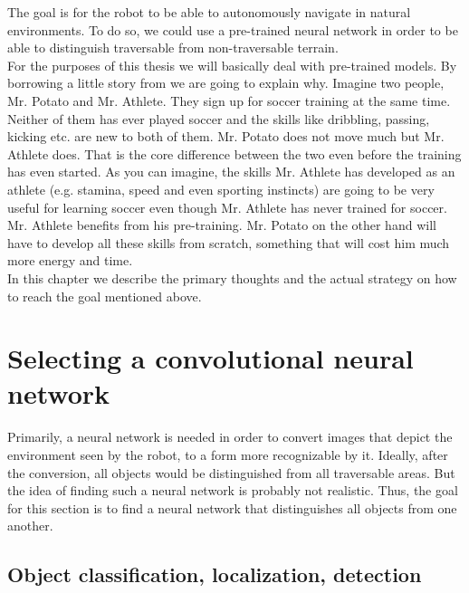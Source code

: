\documentclass[12pt,a4paper,table,dvipsnames,tikz]{report}
\begin{document}
	The goal is for the robot to be able to autonomously navigate in natural environments. 
	To do so, we could use a pre-trained neural network in order to be able to distinguish 
	traversable from non-traversable terrain.
	\\
	
	For the purposes of this thesis we will basically deal with pre-trained models. By
	borrowing a little story from \citet{Gupta} we are going to explain why. Imagine two 
	people, Mr. Potato and Mr. Athlete. They sign up for soccer training at the same time. 
	Neither of them has ever played soccer and the skills like dribbling, passing, 
	kicking etc. are new to both of them. Mr. Potato does not move much but Mr. Athlete 
	does. That is the core difference between the two even before the training has even 
	started. As you can imagine, the skills Mr. Athlete has developed as an athlete 
	(e.g. stamina, speed and even sporting instincts) are going to be very useful for 
	learning soccer even though Mr. Athlete has never trained for soccer. Mr. Athlete 
	benefits from his pre-training. Mr. Potato on the other hand will have to develop all 
	these skills from scratch, something that will cost him much more energy and time.
	\\
	
	In this chapter we describe the primary thoughts and the actual strategy on how to 
	reach the goal mentioned above.
	\\
	
	\section{Selecting a convolutional neural network}
	\label{sec:fg:nn}
	
	Primarily, a neural network is needed in order to convert images that depict the 
	environment seen by the robot, to a form more recognizable by it. Ideally, after 
	the conversion, all objects would be distinguished from all traversable areas. But 
	the idea of finding such a neural network is probably not realistic. Thus, the goal 
	for this section is to find a neural network that distinguishes all objects from 
	one another.
	\\
	
	\subsection{Object classification, localization, detection}
	\label{sec:fg:nn:obj}
	
\end{document}

